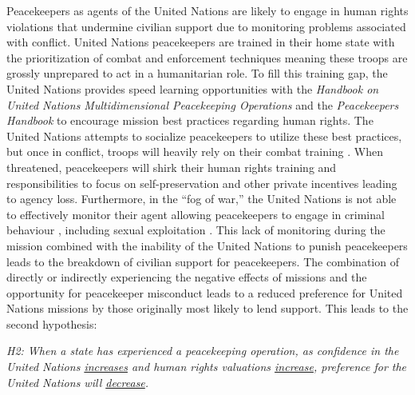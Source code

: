 \documentclass[12pt]{article}
\newcommand{\UN}[1]{United Nations}
\begin{document}
Peacekeepers as agents of the \UN{} are likely to engage in human rights violations that undermine civilian support due to monitoring problems associated with conflict. \UN{} peacekeepers are trained in their home state with the prioritization of combat and enforcement techniques \citep{hasselbladh2020military} meaning these troops are grossly unprepared to act in a humanitarian role. To fill this training gap, the \UN{} provides speed learning opportunities with the \textit{Handbook on United Nations Multidimensional Peacekeeping Operations} and the \textit{Peacekeepers Handbook} to encourage mission best practices regarding human rights. The \UN{} attempts to socialize peacekeepers to utilize these best practices, but once in conflict, troops will heavily rely on their combat training \citep{morgan_morey}. When threatened, peacekeepers will shirk their human rights training and responsibilities to focus on self-preservation and other private incentives \citep{blair2021peacekeeping} leading to agency loss. Furthermore, in the ``fog of war,'' the \UN{} is not able to effectively monitor their agent \citep{akcinaroglu2013private} allowing peacekeepers to engage in criminal behaviour \citep{horne2019impact}, including sexual exploitation \citep{butler2007security}. This lack of monitoring during the mission combined with the inability of the \UN{} to punish peacekeepers \citep{leck2009international} leads to the breakdown of civilian support for peacekeepers. The combination of directly or indirectly experiencing the negative effects of missions and the opportunity for peacekeeper misconduct leads to a reduced preference for \UN{} missions by those originally most likely to lend support. This leads to the second hypothesis:

\begin{center}
\begin{singlespace}
\textit{H2: When a state has experienced a peacekeeping operation, as confidence in the United Nations \underline{increases} and human rights valuations \underline{increase}, preference for the United Nations will \underline{decrease}.}
\end{singlespace}
\end{center}
\end{document}
